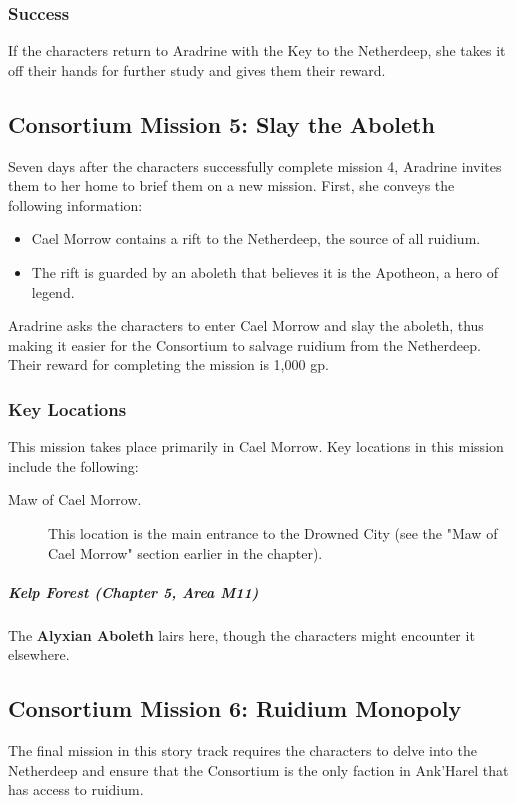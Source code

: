 \documentclass[10pt,a4paper,twoside,fancy,bg=print,twocolumn,openany,nodeprecatedcode]{dndbook}
\begin{document}
\subsubsection{Success}
If the characters return to Aradrine with the Key to the Netherdeep, she takes it off their hands for further study and gives them their reward.

\subsection{Consortium Mission 5: Slay the Aboleth}
Seven days after the characters successfully complete mission 4, Aradrine invites them to her home to brief them on a new mission. First, she conveys the following information:


\begin{itemize}
\item Cael Morrow contains a rift to the Netherdeep, the source of all ruidium.
\item The rift is guarded by an aboleth that believes it is the Apotheon, a hero of legend.
\end{itemize}

Aradrine asks the characters to enter Cael Morrow and slay the aboleth, thus making it easier for the Consortium to salvage ruidium from the Netherdeep. Their reward for completing the mission is 1,000 gp.

\subsubsection{Key Locations}
This mission takes place primarily in Cael Morrow. Key locations in this mission include the following:


\begin{description}
\item[Maw of Cael Morrow.]
This location is the main entrance to the Drowned City (see the "Maw of Cael Morrow" section earlier in the chapter).
\end{description}

\subparagraph{Kelp Forest (Chapter 5, Area M11)}
The \textbf{Alyxian Aboleth} lairs here, though the characters might encounter it elsewhere.

\subsection{Consortium Mission 6: Ruidium Monopoly}
The final mission in this story track requires the characters to delve into the Netherdeep and ensure that the Consortium is the only faction in Ank'Harel that has access to ruidium.
\end{document}

